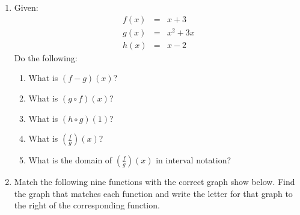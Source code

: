 \documentclass[letterpaper,12pt,fleqn]{article}
\begin{document}
\begin{enumerate}
\item Given:
  \begin{eqnarray*}
    f(x) &=& x+3 \\
    g(x) &=& x^2+3x \\
    h(x) &=& x-2
  \end{eqnarray*}
  Do the following:
  \begin{enumerate}
  \item What is $(f-g)(x)$?

    \vspace{1.25in}
    
  \item What is $(g\circ f)(x)$?

    \vspace{1.25in}
    
  \item What is $(h\circ g)(1)$?

    \vspace{1.25in}
    
  \item What is $\left(\frac{f}{g}\right)(x)$?

    \vspace{1.25in}
    
  \item What is the domain of $\left(\frac{f}{g}\right)(x)$ in interval
    notation?
  \end{enumerate}

  \newpage

  \newcommand{\ans}{\rule{0.5in}{1pt}}

\item Match the following nine functions with the correct graph show below. Find
  the graph that matches each function and write the letter for that graph
  to the right of the corresponding function.

  \vspace{0.25in}


\end{enumerate}
\end{document}
